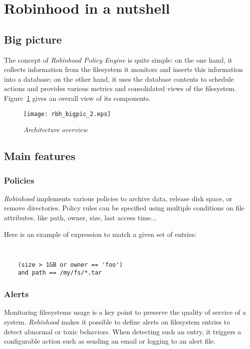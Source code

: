 \documentclass[conference]{IEEEtran}
\begin{document}
\section{Robinhood in a nutshell}

\subsection{Big picture}

The concept of \emph{Robinhood Policy Engine} is quite simple: on the one hand, it collects
information from the filesystem it monitors and inserts this information into a
database; on the other hand, it uses the database contents to schedule actions
and provides various metrics and consolidated views of the filesystem.\\
Figure~\ref{fig:BigPicture} gives an overall view of its components.

\begin{figure}[here]
\centering
\texttt{[image: rbh\_bigpic\_2.eps]}
\caption{\it Architecture overview} \label{fig:BigPicture}
\end{figure}

\subsection{Main features}
\subsubsection{Policies}
\emph{Robinhood} implements various policies to archive data, release disk space,
or remove directories. Po\-li\-cy rules can be specified using multiple conditions on file attributes,
like path, owner, size, last access time...

Here is an example of expression to match a given set of entries:
{\tt \small
\begin{verbatim}
    (size > 1GB or owner == 'foo')
    and path == /my/fs/*.tar
\end{verbatim}
}

\subsubsection{Alerts}
Monitoring filesystems usage is a key point to preserve
the quality of service of a system. \emph{Robinhood} makes it possible to define
alerts on filesystem entries to detect abnormal or toxic behaviors. When
detecting such an entry, it triggers a configurable action such as sending an
email or logging to an alert file.
\end{document}
